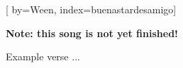 

[%
    by={Ween},
    index={buenastardesamigo}]


    \label{buenastardesamigo}

    \textbf{Note: this song is not yet finished!}

    \beginverse
        Example verse ...
    \endverse
\endsong
